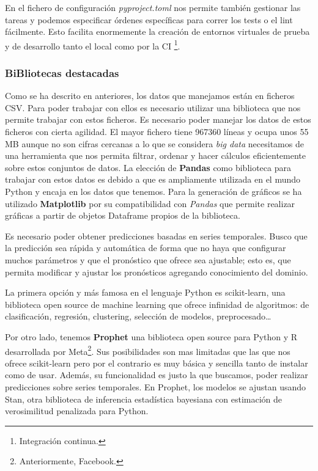 En el fichero de configuración \textit{pyproject.toml} nos permite también gestionar las
tareas y podemos especificar órdenes específicas para correr los tests o el lint
fácilmente. Esto facilita enormemente la creación de entornos virtuales de prueba y de
desarrollo tanto el local como por la CI \footnote{Integración continua.}.


\subsubsection{BiBliotecas destacadas}
Como se ha descrito en anteriores, los datos que manejamos están en ficheros CSV. Para
poder trabajar con ellos es necesario utilizar una biblioteca que nos permite trabajar con
estos ficheros. Es necesario poder manejar los datos de estos ficheros con cierta
agilidad. El mayor fichero tiene 967360 líneas y ocupa unos 55 MB aunque no son cifras
cercanas a lo que se considera \textit{big data} necesitamos de una herramienta que nos
permita filtrar, ordenar y hacer cálculos eficientemente sobre estos conjuntos de datos.
La elección de \textbf{Pandas} como biblioteca para trabajar con estos datos es debido a
que es ampliamente utilizada en el mundo Python y encaja en los datos que tenemos. Para la
generación de gráficos se ha utilizado \textbf{Matplotlib}  por su compatibilidad con
\textit{Pandas} que permite realizar gráficas a partir de objetos Dataframe propios de la
biblioteca.

Es necesario poder obtener predicciones basadas en series temporales. Busco que la
predicción sea rápida y automática de forma que no haya que configurar muchos parámetros y
que el pronóstico que ofrece sea ajustable; esto es, que permita modificar y ajustar los
pronósticos agregando conocimiento del dominio.

La primera opción y más famosa en el lenguaje Python es scikit-learn, una biblioteca open
source de machine learning que ofrece infinidad de algoritmos: de clasificación,
regresión, clustering, selección de modelos, preprocesado\ldots

Por otro lado, tenemos \textbf{Prophet} una biblioteca open source para Python y R
desarrollada por Meta\footnote{Anteriormente, Facebook.}. Sus posibilidades son mas
limitadas que las que nos ofrece scikit-learn pero por el contrario es muy básica y
sencilla tanto de instalar como de usar. Además, su funcionalidad es justo la que
buscamos, poder realizar predicciones sobre series temporales. En Prophet, los modelos se
ajustan usando Stan, otra biblioteca de inferencia estadística bayesiana con estimación de
verosimilitud penalizada para Python.

